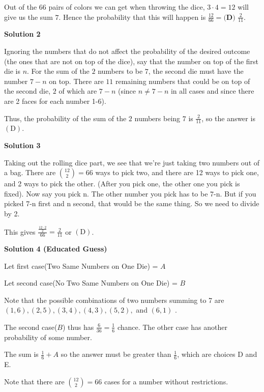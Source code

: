 \begin{enumerate}
 Out of the $66$ pairs of colors we can get when throwing the dice, $3\cdot 4=12$ will give us the sum $7$. Hence the probability that this will happen is $\frac{12}{66} = \boxed{\textbf{(D) }\frac 2{11}}$.

 



\textbf{Solution 2}

Ignoring the numbers that do not affect the probability of the desired outcome (the ones that are not on top of the dice), say that the number on top of the first die is $n$. For the sum of the $2$ numbers to be $7$, the second die must have the number $7-n$ on top. There are $11$ remaining numbers that could be on top of the second die, $2$ of which are $7-n$ (since $n\ne7-n$ in all cases and since there are 2 faces for each number 1-6).

 Thus, the probability of the sum of the $2$ numbers being $7$ is $\frac{2}{11}$, so the answer is $\mathrm{(D)}$.

 



\textbf{Solution 3}

Taking out the rolling dice part, we see that we're just taking two numbers out of a bag. There are ${12 \choose 2}=66$ ways to pick two, and there are 12 ways to pick one, and 2 ways to pick the other. (After you pick one, the other one you pick is fixed). Now say you pick n. The other number you pick has to be 7-n. But if you picked 7-n first and n second, that would be the same thing. So we need to divide by 2. 

 This gives $\frac{\frac{12 \cdot 2}{2}}{66}=\boxed{\frac{2}{11}}$ or $\mathrm{(D)}$.

 



\textbf{Solution 4 (Educated Guess)}

Let first case(Two Same Numbers on One Die) = $A$

 Let second case(No Two Same Numbers on One Die) = $B$

 Note that the possible combinations of two numbers summing to 7 are $(1,6), (2,5), (3,4), (4,3), (5,2),$ and $(6,1)$ .

 The second case($B$) thus has $\frac{6}{36}=\frac{1}{6}$ chance. The other case has another probability of some number. 

 The sum is $\frac{1}{6}+A$ so the answer must be greater than $\frac{1}{6}$, which are choices D and E.

 Note that there are $\binom{12}{2}=66$ cases for a number without restrictions.


\end{enumerate}

